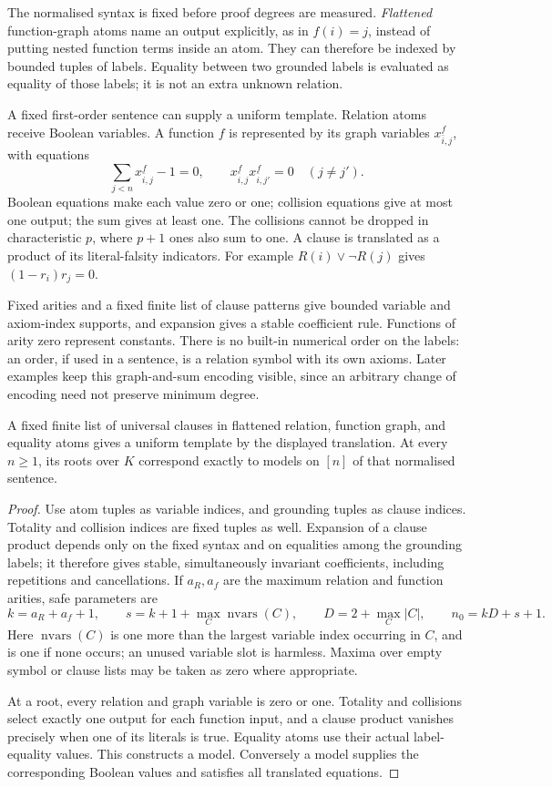 The normalised syntax is fixed before proof degrees are measured.
\emph{Flattened} function-graph atoms name an output explicitly,
as in $f(i)=j$, instead of putting nested function terms inside an
atom. They can therefore be indexed by bounded tuples of labels.
Equality between two grounded labels is evaluated as equality of
those labels; it is not an extra unknown relation.

A fixed first-order sentence can supply a uniform template. Relation
atoms receive Boolean variables. A function $f$ is represented by its
graph variables $x^f_{\bar i,j}$, with equations
\[
 \sum_{j<n}x^f_{\bar i,j}-1=0,\qquad
 x^f_{\bar i,j}x^f_{\bar i,j'}=0\quad(j\ne j').
\]
Boolean equations make each value zero or one; collision equations give
at most one output; the sum gives at least one. The collisions cannot
be dropped in characteristic $p$, where $p+1$ ones also sum to one.
A clause is translated as a product of its literal-falsity indicators.
For example $R(i)\vee\neg R(j)$ gives $(1-r_i)r_j=0$.

Fixed arities and a fixed finite list of clause patterns give bounded
variable and axiom-index supports, and expansion gives a stable
coefficient rule. Functions of arity zero represent constants. There
is no built-in numerical order on the labels: an order, if used in a
sentence, is a relation symbol with its own axioms. Later examples keep
this graph-and-sum encoding visible, since an arbitrary change of
encoding need not preserve minimum degree.

\begin{proposition}\label{tx:prop:compiler}
A fixed finite list of universal clauses in flattened relation, function
graph, and equality atoms gives a uniform template by the displayed
translation. At every $n\ge1$, its roots over $K$ correspond exactly
to models on $[n]$ of that normalised sentence.
\end{proposition}
\begin{proof}
Use atom tuples as variable indices, and grounding tuples as clause
indices. Totality and collision indices are fixed tuples as well.
Expansion of a clause product depends only on the fixed syntax and on
equalities among the grounding labels; it therefore gives stable,
simultaneously invariant coefficients, including repetitions and
cancellations. If $a_R,a_f$ are the maximum relation and function
arities, safe parameters are
\[
 k=a_R+a_f+1,\qquad s=k+1+\max_C\operatorname{nvars}(C),\qquad
 D=2+\max_C|C|,\qquad n_0=kD+s+1.
\]
Here $\operatorname{nvars}(C)$ is one more than the largest variable
index occurring in $C$, and is one if none occurs; an unused variable
slot is harmless. Maxima over empty symbol or clause lists may be taken
as zero where appropriate.

At a root, every relation and graph variable is zero or one. Totality
and collisions select exactly one output for each function input, and
a clause product vanishes precisely when one of its literals is true.
Equality atoms use their actual label-equality values. This constructs
a model. Conversely a model supplies the corresponding Boolean values
and satisfies all translated equations.
\end{proof}

